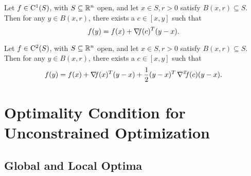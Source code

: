 \documentclass[10pt,a4paper]{article}
\begin{document}
\begin{theorem}\label{thm:mvt}
	Let $f\in \mathord{\mathrm{C^1}}(S)$, with $S\subseteq \mathbb{R}^n$ open, and let $x\in S, r>0$ satisfy $B(x,r)\subseteq S$. Then for any $y\in B(x,r)$, there exists a $c\in [x,y]$ such that 
	\begin{equation*}
		f(y) = f(x)+ \operatorname*{\mathit{\nabla \!f}} (c)^T(y-x).
	\end{equation*}
\end{theorem}
\begin{theorem}\label{thm:mvt2}
	Let $f\in \mathord{\mathrm{C^2}}(S)$, with $S\subseteq \mathbb{R}^n$ open, and let $x\in S, r>0$ satisfy $B(x,r)\subseteq S$. Then for any $y\in B(x,r)$, there exists a $c\in [x,y]$ such that 
	\begin{equation*}
		f(y) = f(x)+ \operatorname*{\mathit{\nabla \!f}} (x)^T(y-x) +\frac{1}{2}(y-x)^T\operatorname*{\mathit{\nabla^2 \!f}}(c)(y-x).
	\end{equation*}
\end{theorem}
\section{Optimality Condition for Unconstrained Optimization}
\subsection{Global and Local Optima}
\end{document}
